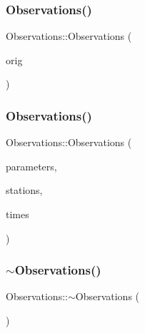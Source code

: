 \mbox{\label{class_observations_a579feccdac9c26226cf813ac8cf3521a}} 
\subsubsection{\texorpdfstring{Observations()}{Observations()}\hspace{0.1cm}{\footnotesize\ttfamily [2/3]}}
{\footnotesize\ttfamily Observations\+::\+Observations (\begin{DoxyParamCaption}\item[{const \mbox{\hyperlink{class_observations}{Observations}} \&}]{orig }\end{DoxyParamCaption})\hspace{0.3cm}{\ttfamily [delete]}}

\mbox{\label{class_observations_acd73489a964b9794e0a265ce394d6f17}} 
\subsubsection{\texorpdfstring{Observations()}{Observations()}\hspace{0.1cm}{\footnotesize\ttfamily [3/3]}}
{\footnotesize\ttfamily Observations\+::\+Observations (\begin{DoxyParamCaption}\item[{\mbox{\hyperlink{classanen_par_1_1_parameters}{anen\+Par\+::\+Parameters}}}]{parameters,  }\item[{\mbox{\hyperlink{classanen_sta_1_1_stations}{anen\+Sta\+::\+Stations}}}]{stations,  }\item[{\mbox{\hyperlink{classanen_time_1_1_times}{anen\+Time\+::\+Times}}}]{times }\end{DoxyParamCaption})}

\mbox{\label{class_observations_a8724b267cce796b0f77f8f2b9e4aaf1d}} 
\subsubsection{\texorpdfstring{$\sim$\+Observations()}{~Observations()}}
{\footnotesize\ttfamily Observations\+::$\sim$\+Observations (\begin{DoxyParamCaption}{ }\end{DoxyParamCaption})\hspace{0.3cm}{\ttfamily [virtual]}}



